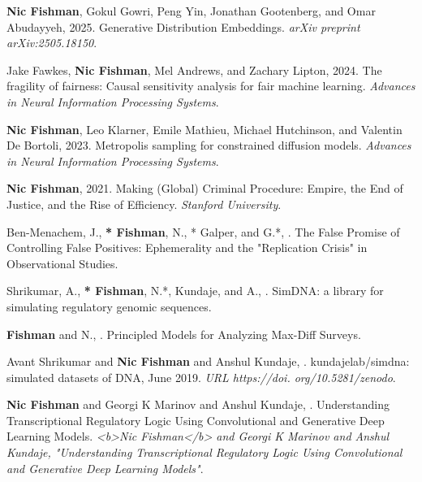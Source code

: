 \begin{cvparagraph}
\begin{addmargin}[2em]{0em}

\textbf{Nic Fishman}, Gokul Gowri, Peng Yin, Jonathan Gootenberg, and Omar Abudayyeh, 2025. Generative Distribution Embeddings. \textit{arXiv preprint arXiv:2505.18150}.

Jake Fawkes, \textbf{Nic Fishman}, Mel Andrews, and Zachary Lipton, 2024. The fragility of fairness: Causal sensitivity analysis for fair machine learning. \textit{Advances in Neural Information Processing Systems}.

\textbf{Nic Fishman}, Leo Klarner, Emile Mathieu, Michael Hutchinson, and Valentin De Bortoli, 2023. Metropolis sampling for constrained diffusion models. \textit{Advances in Neural Information Processing Systems}.

\textbf{Nic Fishman}, 2021. Making (Global) Criminal Procedure: Empire, the End of Justice, and the Rise of Efficiency. \textit{Stanford University}.

Ben-Menachem, J., \textbf{* Fishman}, N., * Galper, and G.*, . The False Promise of Controlling False Positives: Ephemerality and the "Replication Crisis" in Observational Studies.

Shrikumar, A., \textbf{* Fishman}, N.*, Kundaje, and A., . SimDNA: a library for simulating regulatory genomic sequences.

\textbf{Fishman} and N., . Principled Models for Analyzing Max-Diff Surveys.

Avant Shrikumar and \textbf{Nic Fishman} and Anshul Kundaje, . kundajelab/simdna: simulated datasets of DNA, June 2019. \textit{URL https://doi. org/10.5281/zenodo}.

\textbf{Nic Fishman} and Georgi K Marinov and Anshul Kundaje, . Understanding Transcriptional Regulatory Logic Using Convolutional and Generative Deep Learning Models. \textit{<b>Nic Fishman</b> and Georgi K Marinov and Anshul Kundaje, "Understanding Transcriptional Regulatory Logic Using Convolutional and Generative Deep Learning Models"}.

\end{addmargin}

\end{cvparagraph}
